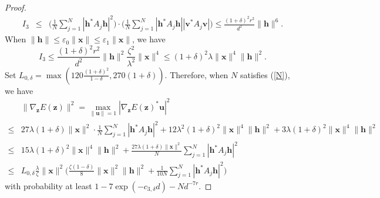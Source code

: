\documentclass{article}
\renewcommand{\eqref}[1]{(\ref{#1})}
\newcommand{\vx}{{\mathbf x}}
\newcommand{\vz}{{\mathbf z}}
\newcommand{\vv}{{\mathbf v}}
\newcommand{\vu}{{\mathbf u}}
\newcommand{\vh}{{\mathbf h}}
\newcommand{\0}{{\mathbf 0}}
\numberwithin{equation}{section}
\begin{document}
\begin{proof}
\begin{eqnarray*}
			I_3
			&\leq&\bigg(\frac{1}{N}\sum^N_{j=1}|\vh^*A_j\vh|^2\bigg)\cdot\bigg(\frac{1}{N}\sum^N_{j=1}|\vh^*A_j\vh||\vv^*A_j\vv|\bigg)
			\le \frac{(1+\delta)^2r^2}{d^2}\|\vh\|^6.
		\end{eqnarray*}
		When $\|\vh\|\le\varepsilon_0\|\vx\|\leq\varepsilon_1\|\vx\|$, we have $$I_3\le\frac{(1+\delta)^2r^2}{d^2}\|\vh\|^2\frac{\zeta^2}{\lambda^2}\|\vx\|^4\le(1+\delta)^2\lambda\|\vx\|^4\|\vh\|^2.$$ Set $L_{0,\delta}=\max\left(120\frac{(1+\delta)^2}{1-\delta},270(1+\delta)\right)$. Therefore, when $ N$ satisfies \eqref{N}, we have 
		\begin{align}
			&\|\nabla_{\vz} E(\vz)\|^2=\max_{\|\vu\|=1}|\nabla_{\vz} E(\vz)^*\vu|^2\nonumber\\
			\le& 27 \lambda(1+\delta)\|\vx\|^2\cdot\frac{1}{N}\sum^N_{j=1}|\vh^*A_j\vh|^2+12\lambda^2(1+\delta)^2\|\vx\|^4\|\vh\|^2+3\lambda(1+\delta)^2\|\vx\|^4\|\vh\|^2\nonumber\\
			\le&15\lambda(1+\delta)^2\|\vx\|^4\|\vh\|^2+\frac{27\lambda(1+\delta)\|\vx\|^2}{N}\sum^N_{j=1}|\vh^*A_j\vh|^2\nonumber\\ 
			\le& L_{0,\delta}\frac{\lambda}{\zeta}\|\vx\|^2\Bigg(\frac{\zeta(1-\delta)}{8}\|\vx\|^2\|\vh\|^2+\frac{1}{10N}\sum_{j=1}^{N}|\vh^*A_j \vh|^2\Bigg)\label{R_cond}
		\end{align}   
		with probability at least $1-7\exp(-c_{3,\delta} d)-Nd^{-7r}$.
		

\end{proof}
\end{document}
